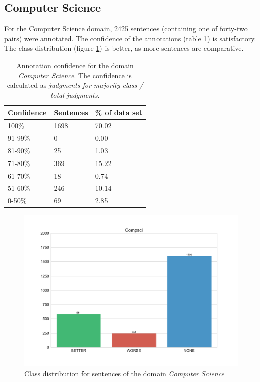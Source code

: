 \subsection{Computer Science}
For the Computer Science domain, 2425 sentences (containing one of forty-two pairs) were annotated. The confidence of the annotations (table \ref{fig:compsci_agg}) is satisfactory. The class distribution (figure \ref{fig:compsci_fin}) is better, as more sentences are comparative.

\begin{table}[h]
\caption{Annotation confidence for the domain \emph{Computer Science}. The confidence is calculated as \emph{judgments for majority class / total judgments}. }
\label{fig:compsci_agg}
\begin{tabularx}{\textwidth}{XXX}
\toprule
Confidence & Sentences & \% of data set \\
\midrule
100\%	&	1698	&	70.02	 \\ 
91-99\%	&	0	&	0.00	 \\ 
81-90\%	&	25	&	1.03	 \\ 
71-80\%	&	369	&	15.22	 \\ 
61-70\%	&	18	&	0.74	 \\ 
51-60\%	&	246	&	10.14	 \\ 
0-50\%	&	69	&	2.85	 \\ 
\bottomrule
\end{tabularx}
\end{table}

\begin{figure}[h]
\centering
\caption{Class distribution for sentences of the domain \emph{Computer Science}}
\label{fig:compsci_fin}
\includegraphics[width=1\textwidth]{images/dataset/Compsci-dist}
\end{figure}

